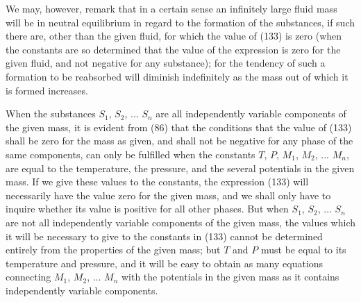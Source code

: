 \documentclass[12pt]{memoir}
\begin{document}
We may, however, remark that in a certain sense an infinitely large fluid mass will be in neutral equilibrium in regard to the formation of the substances, if such there are, other than the given fluid, for which the value of (133) is zero (when the constants are so determined that the value of the expression is zero for the given fluid, and not negative for any substance); for the tendency of such a formation to be reabsorbed will diminish indefinitely as the mass out of which it is formed increases.


When the substances $S_1$, $S_2$, ... $S_n$ are all independently variable components of the given mass, it is evident from (86) that the conditions that the value of (133) shall be zero for the mass as given, and shall not be negative for any phase of the same components, can only be fulfilled when the constants $T$, $P$, $M_1$, $M_2$, ... $M_n$, are equal to the temperature, the pressure, and the several potentials in the given mass. If we give these values to the constants, the expression (133) will necessarily have the value zero for the given mass, and we shall only have to inquire whether its value is positive for all other phases. But when $S_1$, $S_2$, ... $S_n$ are not all independently variable components of the given mass, the values which it will be necessary to give to the constants in (133) cannot be determined entirely from the properties of the given mass; but $T$ and $P$ must be equal to its temperature and pressure, and it will be easy to obtain as many equations connecting $M_1$, $M_2$, ... $M_n$ with the potentials in the given mass as it contains independently variable components.
\end{document}
